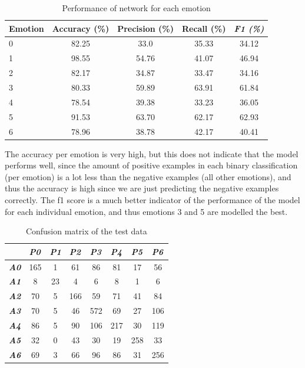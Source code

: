 \documentclass[12pt,twoside]{article}
\begin{document}
\begin{table}[!htbp]
\centering
\begin{tabular}{|l|c|c|c|c|}
\hline
\textbf{Emotion} & \multicolumn{1}{l|}{\textbf{Accuracy (\%)}} & \multicolumn{1}{l|}{\textbf{Precision (\%)}} & \multicolumn{1}{l|}{\textbf{Recall (\%)}} & \multicolumn{1}{l|}{\textit{\textbf{F1 (\%)}}} \\ \hline
0 & 82.25 & 33.0 & 35.33 & 34.12\\ \hline
1 & 98.55 & 54.76 & 41.07 & 46.94\\ \hline
2 & 82.17 & 34.87 & 33.47 & 34.16\\ \hline
3 & 80.33 & 59.89 & 63.91 & 61.84\\ \hline
4 & 78.54 & 39.38 & 33.23 & 36.05\\ \hline
5 & 91.53 & 63.70 & 62.17 & 62.93\\ \hline
6 & 78.96 & 38.78 & 42.17 & 40.41\\ \hline
\end{tabular}
\caption{Performance of network for each emotion}
\label{performance}
\end{table}
The accuracy per emotion is very high, but this does not indicate that the model performs well, since the amount of positive examples in each binary classification (per emotion) is a lot less than the negative examples (all other emotions), and thus the accuracy is high since we are just predicting the negative examples correctly. The f1 score is a much better indicator of the performance of the model for each individual emotion, and thus emotions 3 and 5 are modelled the best. 
\begin{table}[!htbp]
\centering
\begin{tabular}{|l|c|c|c|c|c|c|c|}
\hline
& \multicolumn{1}{l|}{\textit{\textbf{P0}}} & \multicolumn{1}{l|}{\textit{\textbf{P1}}} & \multicolumn{1}{l|}{\textit{\textbf{P2}}} & \multicolumn{1}{l|}{\textit{\textbf{P3}}} & \multicolumn{1}{l|}{\textit{\textbf{P4}}} & \multicolumn{1}{l|}{\textit{\textbf{P5}}} & \multicolumn{1}{l|}{\textit{\textbf{P6}}} \\ \hline
\textit{\textbf{A0}} & 165 & 1  & 61 & 86 & 81 & 17 & 56 \\ \hline
\textit{\textbf{A1}} & 8   & 23 & 4  & 6  & 8 & 1 & 6 \\ \hline
\textit{\textbf{A2}} & 70 & 5 & 166 & 59 & 71 & 41 & 84 \\ \hline
\textit{\textbf{A3}} & 70 & 5 & 46 & 572 & 69 & 27 & 106 \\ \hline
\textit{\textbf{A4}} & 86 & 5 & 90 & 106 & 217 & 30 & 119 \\ \hline
\textit{\textbf{A5}} & 32 & 0 & 43 & 30 & 19 & 258 & 33  \\ \hline
\textit{\textbf{A6}} & 69 & 3 & 66 & 96 & 86 & 31 & 256 \\ \hline
\end{tabular}
\caption{Confusion matrix of the test data}
\label{confusion}
\end{table}
\end{document}
